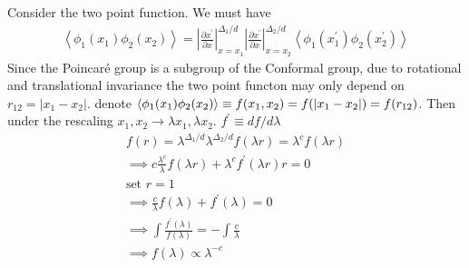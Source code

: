 \chapter{}
Consider the two point function. We must have 
\begin{align*}
 \left\langle \phi_1(x_1) \phi_2(x_2)\right\rangle = \left| \frac{\partial x^\prime}{\partial x}\right|_{x=x_1}^{\Delta_1/d} \left| \frac{\partial x^\prime}{\partial x}\right|_{x=x_2}^{\Delta_2/d} \left\langle \phi_1(x_1^\prime) \phi_2(x_2^\prime) \right\rangle
\end{align*}
Since the Poincar\'{e} group is a subgroup of the Conformal group, due to rotational and translational invariance the two point functon may only depend on $r_{12}=|x_1-x_2|$. denote $\Braket{\phi_1(x_1)\phi_2(x_2)} \equiv f(x_1,x_2) = f(|x_1-x_2|)=f(r_{12})$. 
Then under the rescaling $x_1, x_2 \to \lambda x_1, \lambda x_2$. $f^\prime \equiv {df}/{d\lambda}$
\begin{align*}
 f(r)=\lambda^{\Delta_1/d} \lambda^{\Delta_2/d} f(\lambda r) = \lambda^c  f(\lambda r) \\
 \implies c\frac{\lambda^c}{\lambda} f(\lambda r) + \lambda^c f^\prime(\lambda r) r =0 \\
 \text{set } r = 1 \\
 \implies \frac{c}{\lambda} f(\lambda) + f^\prime(\lambda ) = 0 \\
 \implies \int \frac{f^\prime(\lambda )}{f(\lambda)} = - \int \frac{c}{\lambda} \\
 \implies f(\lambda) \propto \lambda^{-c}
\end{align*}

